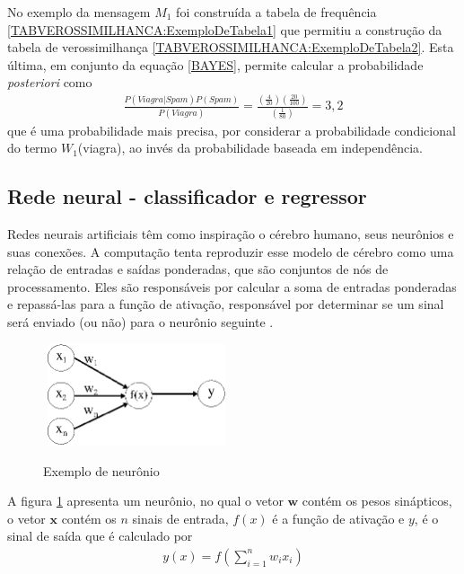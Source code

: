 \egroup
No exemplo da mensagem \(M_{1}\) foi construída a tabela de frequência \ref{TABVEROSSIMILHANCA:ExemploDeTabela1} que permitiu a construção da tabela de verossimilhança \ref{TABVEROSSIMILHANCA:ExemploDeTabela2}. Esta última, em conjunto da equação \eqref{BAYES}, permite calcular a probabilidade \emph{posteriori} como
\begin{align}
\frac{P(Viagra|Spam)P(Spam)}{P(Viagra)} = \frac{ \left(\frac{4}{20}\right) \left(\frac{20}{100}\right)}{\left(\frac{1}{80}\right)} = 3,2
\end{align}
que é uma probabilidade mais precisa, por considerar a probabilidade condicional do termo \(W_{1}\)(viagra), ao invés da probabilidade baseada em independência.

\subsection{Rede neural - classificador e regressor}
Redes neurais artificiais têm como inspiração o cérebro humano, seus neurônios e suas conexões. A computação tenta reproduzir esse modelo de cérebro como uma relação de entradas e saídas ponderadas, que são conjuntos de nós de processamento. Eles são responsáveis por calcular a soma de entradas ponderadas e repassá-las para a função de ativação, responsável por determinar se um sinal será enviado (ou não) para o neurônio seguinte \cite{Haykin2007}.
\begin{figure}[hbt]
	\centering
 	\caption{Exemplo de neurônio}
	\includegraphics[width=5.5cm,height=3cm]{./secoes/conceitosFundamentais/pics/img/RedeNeural.eps}
	\label{FIGURA_REDE_NEURAL_NEURONIO}
	\vspace{0.1cm}
\end{figure}

A figura \ref{FIGURA_REDE_NEURAL_NEURONIO} apresenta um neurônio, no qual o vetor \(\mathbf{w}\) contém os pesos sinápticos, o vetor \(\mathbf{x}\) contém os \(n\) sinais de entrada, \(f(x)\) é a função de ativação e \(y\), é o sinal de saída que é calculado por
\begin{align}
y(x) = f \left( \sum\limits_{i=1}^{n} w_{i}x_{i} \right)
\end{align}


